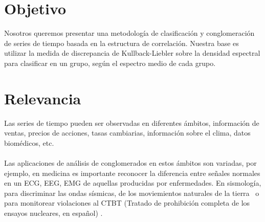 \documentclass[twocolumn,10pt]{asme2ej}
\begin{document}
\section{Objetivo} %
\label{sec:objetivo}

Nosotros queremos presentar una metodolog\'ia de clasificaci\'on y conglomeraci\'on de series de tiempo basada en la estructura de correlaci\'on. Nuestra base es utilizar la medida de discrepancia de Kullback-Liebler sobre la densidad espectral para clasificar en un grupo, seg\'un el espectro medio de cada grupo.




\section{Relevancia} %
\label{sec:relevancia}
Las series de tiempo pueden ser observadas en diferentes \'ambitos, informaci\'on de ventas, precios de acciones, tasas cambiarias, informaci\'on sobre el clima, datos biom\'edicos, etc. ~\cite{TIME_SERIES_CLUSTERING}\\\\
Las aplicaciones de an\'alisis de conglomerados en estos \'ambitos son variadas, por ejemplo, en medicina es importante reconocer la diferencia entre se\~nales normales en un ECG, EEG, EMG de aquellas producidas por enfermedades. En sismolog\'ia, para discriminar las ondas s\'ismicas, de los moviemientos naturales de la tierra~\cite{TIME_SERIES_CLUSTERING_2} o para monitorear violaciones al CTBT (Tratado de prohibici\'on completa de los ensayos nucleares, en espa\~nol) \cite{SUBJ_SP1}.\\
\end{document}
